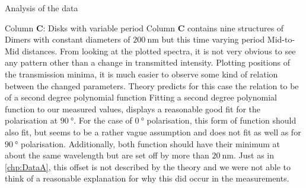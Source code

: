 \documentclass[pdftex, a4paper,11pt, twoside, UKenglish]{report}
\begin{document}
\begin{chapter}{Analysis of the data}
    \newpage
    \begin{section}{Column \textbf{C}: Disks with variable period}
      \label{chp:DataC}
      Column \textbf{C} contains nine structures of Dimers with constant
      diameters of $\SI{200}{\nano\meter}$ but this time varying period
      Mid-to-Mid distances.
      From looking at the plotted spectra, it is not very obvious to see any
      pattern other than a change in transmitted intensity.
      Plotting positions of the transmission minima, it is much easier to
      observe some kind of relation between the changed parameters.\newline
      Theory predicts for this case the relation to be of a second degree 
      polynomial function
      Fitting a second degree polynomial function to our measured values, 
      displays a reasonable good fit for the polarisation at $\SI{90}{\degree}$.
      For the case of $\SI{0}{\degree}$ polarisation, this form of function
      should also fit, but seems to be a rather vague assumption and does not
      fit as well as for $\SI{90}{\degree}$ polarisation.
      Additionally, both function should have their minimum at about the same
      wavelength but are set off by more than $\SI{20}{\nano\meter}$.
      Just as in \cref{chp:DataA}, this offset is not described by the theory
      and we were not able to think of a reasonable explanation for why this
      did occur in the measurements.
      
      

\end{section}
\end{chapter}
\end{document}
